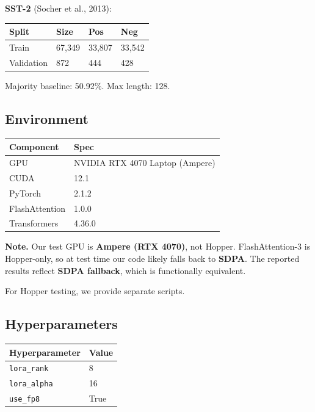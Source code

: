 \textbf{SST-2} (Socher et al., 2013):

\begin{table}[H]
\centering
\small
\begin{tabular}{llll}
\toprule
\textbf{Split} & \textbf{Size} & \textbf{Pos} & \textbf{Neg} \\
\midrule
Train & 67,349 & 33,807 & 33,542 \\
Validation & 872 & 444 & 428 \\
\bottomrule
\end{tabular}
\end{table}

Majority baseline: 50.92\%. Max length: 128.

\subsection{Environment}

\begin{table}[H]
\centering
\small
\begin{tabular}{ll}
\toprule
\textbf{Component} & \textbf{Spec} \\
\midrule
GPU & NVIDIA RTX 4070 Laptop (Ampere) \\
CUDA & 12.1 \\
PyTorch & 2.1.2 \\
FlashAttention & 1.0.0 \\
Transformers & 4.36.0 \\
\bottomrule
\end{tabular}
\end{table}

\textbf{Note.} Our test GPU is \textbf{Ampere (RTX 4070)}, not Hopper. FlashAttention-3 
is Hopper-only, so at test time our code likely falls back to \textbf{SDPA}. 
The reported results reflect \textbf{SDPA fallback}, which is functionally 
equivalent.

For Hopper testing, we provide separate scripts.

\subsection{Hyperparameters}

\begin{table}[H]
\centering
\small
\begin{tabular}{ll}
\toprule
\textbf{Hyperparameter} & \textbf{Value} \\
\midrule
\texttt{lora\_rank} & 8 \\
\texttt{lora\_alpha} & 16 \\
\texttt{use\_fp8} & True \\
\bottomrule
\end{tabular}
\end{table}

